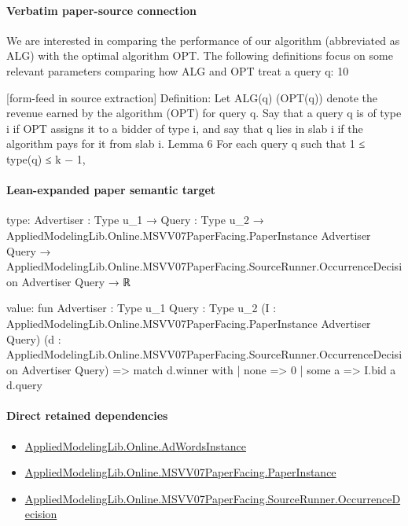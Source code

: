 \documentclass[10pt]{article}
\begin{document}
\paragraph{Verbatim paper-source connection}
\begin{ReviewVerbatim}
We are interested in comparing the performance of our algorithm (abbreviated as ALG) with
the optimal algorithm OPT. The following definitions focus on some relevant parameters comparing how ALG and OPT treat a query q:
10


[form-feed in source extraction]
Definition: Let ALG(q) (OPT(q)) denote the revenue earned by the algorithm (OPT) for
query q. Say that a query q is of type i if OPT assigns it to a bidder of type i, and say that q
lies in slab i if the algorithm pays for it from slab i.
Lemma 6 For each query q such that 1 ≤ type(q) ≤ k − 1,
\end{ReviewVerbatim}



\paragraph{Lean-expanded paper semantic target}
\begin{ReviewVerbatim}
type:
{Advertiser : Type u_1} →
  {Query : Type u_2} →
    AppliedModelingLib.Online.MSVV07PaperFacing.PaperInstance Advertiser Query →
      AppliedModelingLib.Online.MSVV07PaperFacing.SourceRunner.OccurrenceDecision Advertiser Query → ℝ

value:
fun {Advertiser : Type u_1} {Query : Type u_2}
    (I : AppliedModelingLib.Online.MSVV07PaperFacing.PaperInstance Advertiser Query)
    (d : AppliedModelingLib.Online.MSVV07PaperFacing.SourceRunner.OccurrenceDecision Advertiser Query) =>
  match d.winner with
  | none => 0
  | some a => I.bid a d.query
\end{ReviewVerbatim}

\paragraph{Direct retained dependencies}
\begin{itemize}\raggedright
\item \hyperlink{governing-declaration-e5ce49672bf26ab1}{Applied\allowbreak{}Modeling\allowbreak{}Lib.\allowbreak{}Online.\allowbreak{}Ad\allowbreak{}Words\allowbreak{}Instance}
\item \hyperlink{governing-declaration-11907576ec71eeb5}{Applied\allowbreak{}Modeling\allowbreak{}Lib.\allowbreak{}Online.\allowbreak{}MSVV07\allowbreak{}Paper\allowbreak{}Facing.\allowbreak{}Paper\allowbreak{}Instance}
\item \hyperlink{governing-declaration-97202a3921106ed9}{Applied\allowbreak{}Modeling\allowbreak{}Lib.\allowbreak{}Online.\allowbreak{}MSVV07\allowbreak{}Paper\allowbreak{}Facing.\allowbreak{}Source\allowbreak{}Runner.\allowbreak{}Occurrence\allowbreak{}Decision}
\end{itemize}
\end{document}
